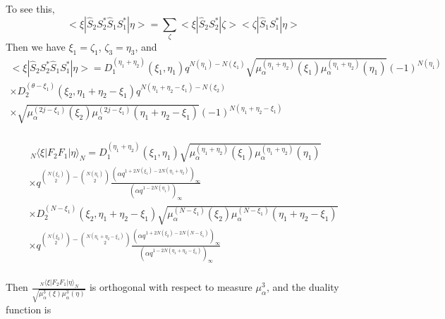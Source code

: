 To see this, 
\begin{equation}
    <\xi|\hat{S}_2S_2^*\hat{S}_1S_1^*|\eta>=\sum_{\zeta} <\xi|\hat{S}_2S_2^*|\zeta><\zeta|\hat{S}_1S_1^*|\eta>
\end{equation}
Then we have $\xi_1=\zeta_1$, $\zeta_3=\eta_3$,
and 
\begin{equation}
\begin{split}
    <\xi|\hat{S}_2S_2^*\hat{S}_1S_1^*|\eta>=D_1^{(\eta_1+\eta_2)}(\xi_1,\eta_1)q^{N(\eta_1)-N(\xi_1)}\sqrt{\mu^{(\eta_1+\eta_2)}_\alpha(\xi_1)\mu^{(\eta_1+\eta_2)}_\alpha(\eta_1)}(-1)^{N(\eta_1)}\\
  \times D_2^{(\theta-\xi_1)}(\xi_2,\eta_1+\eta_2-\xi_1)q^{N(\eta_1+\eta_2-\xi_1)-N(\xi_2)}\\
 \times  \sqrt{\mu^{(2j-\xi_1)}_\alpha(\xi_2)\mu^{(2j-\xi_1)}_\alpha(\eta_1+\eta_2-\xi_1)}(-1)^{N(\eta_1+\eta_2-\xi_1)}\\
\end{split}
\end{equation}



\begin{equation}
\begin{split}
  \,_{N}  \langle\xi|F_2F_1|\eta\rangle_{N}=D_1^{(\eta_1+\eta_2)}(\xi_1,\eta_1)\sqrt{\mu^{(\eta_1+\eta_2)}_\alpha(\xi_1)\mu^{(\eta_1+\eta_2)}_\alpha(\eta_1)}\\
  \times q^{\binom{N(\xi_1)}{2}-\binom{N(\eta_1)}{2}}\frac{\left(\alpha q^{1+2N(\xi_1)-2N(\eta_1+\eta_2)} \right)_\infty}{\left(\alpha q^{1-2N(\eta_1)} \right)_\infty} \\
  \times D_2^{(N-\xi_1)}(\xi_2,\eta_1+\eta_2-\xi_1)
 \sqrt{\mu^{(N-\xi_1)}_\alpha(\xi_2)\mu^{(N-\xi_1)}_\alpha(\eta_1+\eta_2-\xi_1)}\\ \times q^{\binom{N(\xi_2)}{2}-\binom{N(\eta_1+\eta_2-\xi_1)}{2}}\frac{\left(\alpha q^{1+2N(\xi_2)-2N(N-\xi_1)} \right)_\infty}{\left(\alpha q^{1-2N(\eta_1+\eta_2-\xi_1)} \right)_\infty} \\
\end{split}
\end{equation}




Then $\frac{\,_{N}  \langle\xi|F_2F_1|\eta\rangle_{N}}{\sqrt{ \mu_\alpha^3(\xi) \mu_\alpha^3(\eta)}}$ is orthogonal with respect to measure $ \mu_\alpha^3$, and the duality function is 

